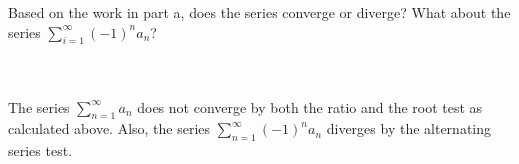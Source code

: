 Based on the work in part a, does the series converge or diverge? What about the series
$\sum_{i=1}^{\infty}(-1)^na_n$?\\\\

\begin{solution}\renewcommand{\qedsymbol}{}\ \\
    The series $\sum_{n=1}^{\infty} a_n$ does not converge by both the ratio and the root test as
    calculated above. Also, the series $\sum_{n=1}^{\infty} (-1)^na_n$ diverges by the alternating
    series test.

\end{solution}